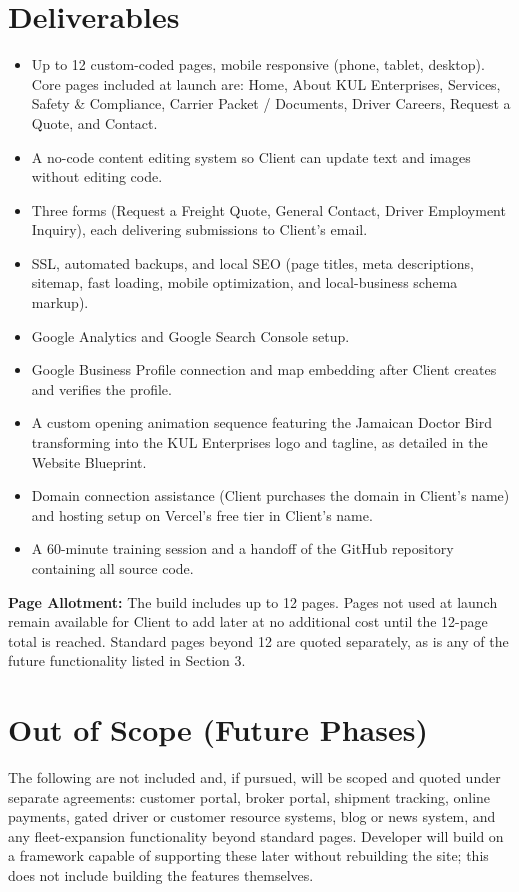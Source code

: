 \documentclass[11pt]{article}
\begin{document}
\begin{Form}
\section{Deliverables}
\begin{itemize}
  \item Up to 12 custom-coded pages, mobile responsive (phone, tablet, desktop). Core pages included at launch are: Home, About KUL Enterprises, Services, Safety \& Compliance, Carrier Packet / Documents, Driver Careers, Request a Quote, and Contact.
  \item A no-code content editing system so Client can update text and images without editing code.
  \item Three forms (Request a Freight Quote, General Contact, Driver Employment Inquiry), each delivering submissions to Client's email.
  \item SSL, automated backups, and local SEO (page titles, meta descriptions, sitemap, fast loading, mobile optimization, and local-business schema markup).
  \item Google Analytics and Google Search Console setup.
  \item Google Business Profile connection and map embedding after Client creates and verifies the profile.
  \item A custom opening animation sequence featuring the Jamaican Doctor Bird transforming into the KUL Enterprises logo and tagline, as detailed in the Website Blueprint.
  \item Domain connection assistance (Client purchases the domain in Client's name) and hosting setup on Vercel's free tier in Client's name.
  \item A 60-minute training session and a handoff of the GitHub repository containing all source code.
\end{itemize}

\noindent\textbf{Page Allotment:} The build includes up to 12 pages. Pages not used at launch remain available for Client to add later at no additional cost until the 12-page total is reached. Standard pages beyond 12 are quoted separately, as is any of the future functionality listed in Section 3.

\section{Out of Scope (Future Phases)}
The following are not included and, if pursued, will be scoped and quoted under separate agreements: customer portal, broker portal, shipment tracking, online payments, gated driver or customer resource systems, blog or news system, and any fleet-expansion functionality beyond standard pages. Developer will build on a framework capable of supporting these later without rebuilding the site; this does not include building the features themselves.


\end{Form}
\end{document}

